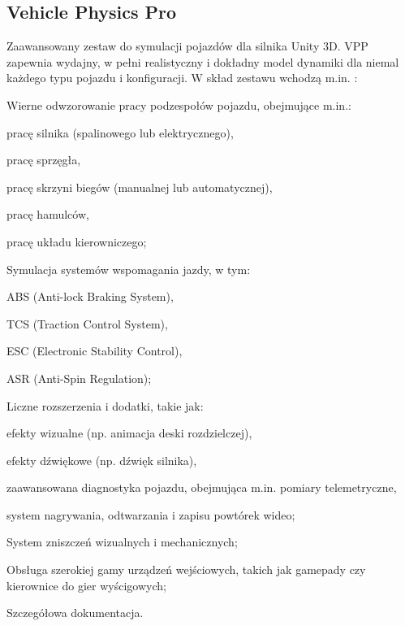 \subsection{Vehicle Physics Pro}
Zaawansowany zestaw do symulacji pojazdów dla silnika Unity 3D. VPP zapewnia wydajny, w pełni realistyczny i dokładny model dynamiki dla niemal każdego typu pojazdu i konfiguracji. W skład zestawu wchodzą m.in. \cite{vpp:features}:
\begin{enumerate*}
\item Wierne odwzorowanie pracy podzespołów pojazdu, obejmujące m.in.:
\begin{itemize*}
\item pracę silnika (spalinowego lub elektrycznego),
\item pracę sprzęgła,
\item pracę skrzyni biegów (manualnej lub automatycznej),
\item pracę hamulców,
\item pracę układu kierowniczego;
\end{itemize*}
\item Symulacja systemów wspomagania jazdy, w tym:
\begin{itemize*}
\item ABS (Anti-lock Braking System),
\item TCS (Traction Control System),
\item ESC (Electronic Stability Control),
\item ASR (Anti-Spin Regulation);
\end{itemize*}
\item Liczne rozszerzenia i dodatki, takie jak:
\begin{itemize*}
\item efekty wizualne (np. animacja deski rozdzielczej),
\item efekty dźwiękowe (np. dźwięk silnika),
\item zaawansowana diagnostyka pojazdu, obejmująca m.in. pomiary telemetryczne,
\item system nagrywania, odtwarzania i zapisu powtórek wideo;
\end{itemize*}
\item System zniszczeń wizualnych i mechanicznych;
\item Obsługa szerokiej gamy urządzeń wejściowych, takich jak gamepady czy kierownice do gier wyścigowych;
\item Szczegółowa dokumentacja.
\end{enumerate*}

